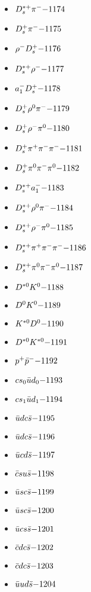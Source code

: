 \begin{multicols}{3}
\begin{itemize}
 \item $ D_{s}^{*+} \pi^{-} \hfill{-1174}$
 \item $ D_{s}^{+} \pi^{-} \hfill{-1175}$
 \item $ \rho^{-} D_{s}^{+} \hfill{-1176}$
 \item $ D_{s}^{*+} \rho^{-} \hfill{-1177}$
 \item $ a_{1}^{-} D_{s}^{+} \hfill{-1178}$
 \item $ D_{s}^{+} \rho^{0} \pi^{-} \hfill{-1179}$
 \item $ D_{s}^{+} \rho^{-} \pi^{0} \hfill{-1180}$
 \item $ D_{s}^{+} \pi^{+} \pi^{-} \pi^{-} \hfill{-1181}$
 \item $ D_{s}^{+} \pi^{0} \pi^{-} \pi^{0} \hfill{-1182}$
 \item $ D_{s}^{*+} a_{1}^{-} \hfill{-1183}$
 \item $ D_{s}^{*+} \rho^{0} \pi^{-} \hfill{-1184}$
 \item $ D_{s}^{*+} \rho^{-} \pi^{0} \hfill{-1185}$
 \item $ D_{s}^{*+} \pi^{+} \pi^{-} \pi^{-} \hfill{-1186}$
 \item $ D_{s}^{*+} \pi^{0} \pi^{-} \pi^{0} \hfill{-1187}$
 \item $ D^{*0} K^{0} \hfill{-1188}$
 \item $ D^{0} K^{0} \hfill{-1189}$
 \item $ K^{*0} D^{0} \hfill{-1190}$
 \item $ D^{*0} K^{*0} \hfill{-1191}$
 \item $ p^{+} \bar{p}^{-} \hfill{-1192}$
 \item $ cs_{0} \bar{u}d_{0} \hfill{-1193}$
 \item $ cs_{1} \bar{u}d_{1} \hfill{-1194}$
 \item $ \bar{u} d c \bar{s} \hfill{-1195}$
 \item $ \bar{u} d c \bar{s} \hfill{-1196}$
 \item $ \bar{u} c d \bar{s} \hfill{-1197}$
 \item $ \bar{c} s u \bar{s} \hfill{-1198}$
 \item $ \bar{u} s c \bar{s} \hfill{-1199}$
 \item $ \bar{u} s c \bar{s} \hfill{-1200}$
 \item $ \bar{u} c s \bar{s} \hfill{-1201}$
 \item $ \bar{c} d c \bar{s} \hfill{-1202}$
 \item $ \bar{c} d c \bar{s} \hfill{-1203}$
 \item $ \bar{u} u d \bar{s} \hfill{-1204}$

\end{itemize}
\end{multicols}
